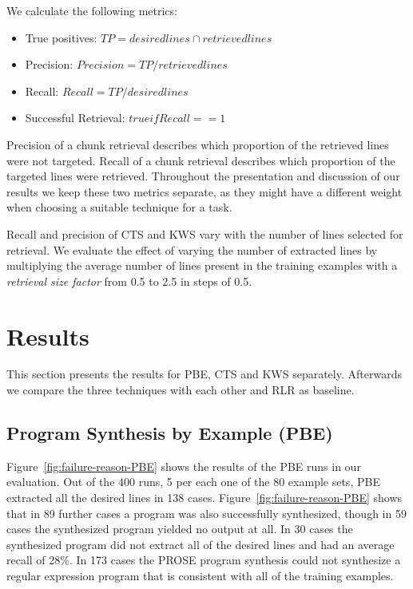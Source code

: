 \documentclass[\myrootdir/main.tex]{subfiles}
\begin{document}
We calculate the following metrics:
\begin{itemize}
	\item True positives: $TP = desiredlines \cap retrievedlines$
	\item Precision: $Precision = TP / retrievedlines$
	\item Recall: $Recall = TP / desiredlines$
	\item Successful Retrieval: $true if Recall == 1$
\end{itemize}

Precision of a chunk retrieval describes which proportion of the retrieved lines were not targeted.
Recall of a chunk retrieval describes which proportion of the targeted lines were retrieved.
Throughout the presentation and discussion of our results we keep these two metrics separate, as they might have a different weight when choosing a suitable technique for a task.

Recall and precision of CTS and KWS vary with the number of lines selected for retrieval.
We evaluate the effect of varying the number of extracted lines by multiplying the average number of lines present in the training examples with a \emph{retrieval size factor} from 0.5 to 2.5 in steps of 0.5.


\section{Results}
This section presents the results for PBE, CTS and KWS separately.
Afterwards we compare the three techniques with each other and RLR as baseline.

\subsection{Program Synthesis by Example (PBE)}
Figure~\ref{fig:failure-reason-PBE} shows the results of the PBE runs in our evaluation.
Out of the 400 runs, 5 per each one of the 80 example sets, PBE extracted all the desired lines in 138 cases.
Figure~\ref{fig:failure-reason-PBE} shows that in 89 further cases a program was also successfully synthesized, though in 59 cases the synthesized program yielded no output at all.
In 30 cases the synthesized program did not extract all of the desired lines and had an average recall of 28\%.
In 173 cases the PROSE program synthesis could not synthesize a regular expression program that is consistent with all of the training examples.
\end{document}
